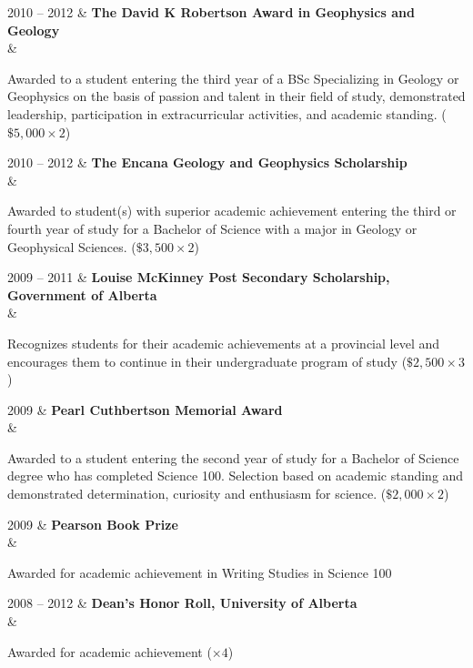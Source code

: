 \documentclass[oneside]{cv}
\newenvironment{myquote}%
  {\list{}{\leftmargin=0.5cm\rightmargin=0cm}\item[]}%
  {\endlist}
\newcommand{\myindent}[1]{
    \begin{myquote}
    \vspace{-0.7cm}
        #1
    \vspace{-0.4cm}
    \end{myquote}
}
\begin{document}
\begin{entryright}
2010 -- 2012 & \textbf{The David K Robertson Award in Geophysics and Geology} \\
& \myindent{Awarded to a student entering the third year of a BSc Specializing in Geology or Geophysics on the basis of passion and talent in their field of study, demonstrated leadership, participation in extracurricular activities, and academic standing. ($\$5,000 \times 2$)}
\end{entryright}

\begin{entryright}
2010 -- 2012 & \textbf{The Encana Geology and Geophysics Scholarship} \\
& \myindent{Awarded to student(s) with superior academic achievement entering the third or fourth year of study for a Bachelor of Science with a major in Geology or Geophysical Sciences. ($\$3,500 \times 2$)}
\end{entryright}

\begin{entryright}
2009 -- 2011 & \textbf{Louise McKinney Post Secondary Scholarship, Government of Alberta} \\
& \myindent{Recognizes students for their academic achievements at a provincial level and encourages them to continue in their undergraduate program of study ($\$2,500 \times 3$)}
\end{entryright}

\begin{entryright}
2009 & \textbf{Pearl Cuthbertson Memorial Award} \\
& \myindent{Awarded to a student entering the second year of study for a Bachelor of Science degree who has completed Science 100. Selection based on academic standing and demonstrated determination, curiosity and enthusiasm for science. ($\$2,000 \times 2$)}
\end{entryright}

\begin{entryright}
2009 & \textbf{Pearson Book Prize}\\
& \myindent{Awarded for academic achievement in Writing Studies in Science 100}
\end{entryright}

\begin{entryright}
2008 -- 2012 & \textbf{Dean's Honor Roll, University of Alberta} \\
& \myindent{Awarded for academic achievement ($\times 4$)}
\end{entryright}
\end{document}
